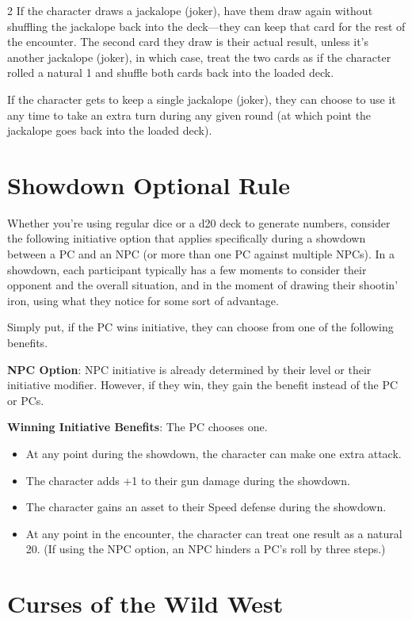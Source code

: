 \begin{multicols}{2}
If the character draws a jackalope (joker), have them draw again without shuffling the jackalope back into the deck—they can keep that card for the rest of the encounter. The second card they draw is their actual result, unless it’s another jackalope (joker), in which case, treat the two cards as if the character rolled a natural 1 and shuffle both cards back into the loaded deck. 

If the character gets to keep a single jackalope (joker), they can choose to use it any time to take an extra turn during any given round (at which point the jackalope goes back into the loaded deck).

\chapter{Showdown Optional Rule}
 
Whether you’re using regular dice or a d20 deck to generate numbers, consider the following initiative option that applies specifically during a showdown between a PC and an NPC (or more than one PC against multiple NPCs). In a showdown, each participant typically has a few moments to consider their opponent and the overall situation, and in the moment of drawing their shootin’ iron, using what they notice for some sort of advantage. 

Simply put, if the PC wins initiative, they can choose from one of the following benefits. 

\textbf{NPC Option}: NPC initiative is already determined by their level or their initiative modifier. However, if they win, they gain the benefit instead of the PC or PCs. 

\textbf{Winning Initiative Benefits}: The PC chooses one. 

\begin{itemize}
\item At any point during the showdown, the character can make one extra attack. 
\item The character adds +1 to their gun damage during the showdown. 
\item The character gains an asset to their Speed defense during the showdown. 
\item At any point in the encounter, the character can treat one result as a natural 20. (If using the NPC option, an NPC hinders a PC’s roll by three steps.) 
\end{itemize}

\chapter{Curses of the Wild West}


\end{multicols}
